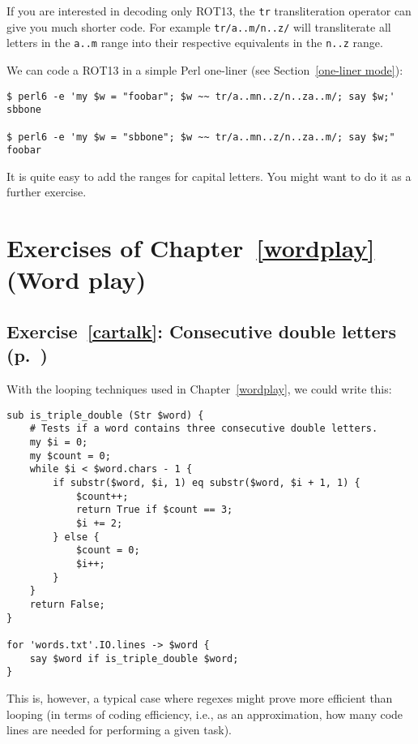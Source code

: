 If you are interested in decoding only ROT13, the {\tt tr} 
transliteration operator can give you much shorter code. 
For example {\tt tr/a..m/n..z/} will transliterate all 
letters in the {\tt a..m} range into their respective 
equivalents in the {\tt n..z} range.

We can code a ROT13 in a simple Perl one-liner (see Section~\ref{one-liner mode}):
\label{rot13_oneliner}

\begin{verbatim}
$ perl6 -e 'my $w = "foobar"; $w ~~ tr/a..mn..z/n..za..m/; say $w;'
sbbone

$ perl6 -e 'my $w = "sbbone"; $w ~~ tr/a..mn..z/n..za..m/; say $w;"
foobar
\end{verbatim}

It is quite easy to add the ranges for capital letters. You might want to do it as a further exercise.


\section{Exercises of Chapter~\ref{wordplay} (Word play)}

\subsection{Exercise~\ref{cartalk}: Consecutive double letters (p.~\pageref{cartalk})}
\label{sol_cartalk}

With the looping techniques used in Chapter~\ref{wordplay}, 
we could write this:

\begin{verbatim}
sub is_triple_double (Str $word) {
    # Tests if a word contains three consecutive double letters.
    my $i = 0;
    my $count = 0;
    while $i < $word.chars - 1 {
        if substr($word, $i, 1) eq substr($word, $i + 1, 1) {
            $count++;
            return True if $count == 3;
            $i += 2;
        } else {
            $count = 0;
            $i++;
        }
    }
    return False;
}

for 'words.txt'.IO.lines -> $word {
    say $word if is_triple_double $word;
}
\end{verbatim}
%

This is, however, a typical case where regexes might prove 
more efficient than looping  (in terms of coding efficiency, 
i.e., as an approximation, how many code lines are needed 
for performing a given task).

